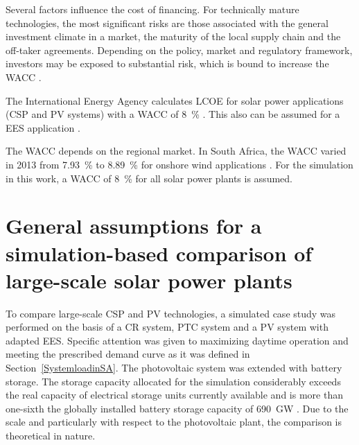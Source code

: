 Several factors influence the cost of financing. For technically mature technologies, the most significant risks are those associated with the general investment climate in a market, the maturity of the local supply chain and the off-taker agreements. Depending on the policy, market and regulatory framework, investors may be exposed to substantial risk, which is bound to increase the WACC \cite{IEA2014c}.


The International Energy Agency calculates LCOE for solar power applications (CSP and PV systems) with a WACC of \SI{8}{\percent} \cite{IEA2014c}. This also can be assumed for a EES application \cite{Zakeri2015}.


The WACC depends on the regional market. In South Africa, the WACC varied in 2013 from \SI{7.93}{\percent} to \SI{8.89}{\percent} for onshore wind applications \cite{IEA2015}. For the simulation in this work, a WACC of \SI{8}{\percent} for all solar power plants is assumed.

\section{General assumptions for a simulation-based comparison of large-scale solar power plants} \label{General assumptions}
To compare large-scale CSP and PV technologies, a simulated case study was performed on the basis of a CR system, PTC system and a PV system with adapted EES. Specific attention was given to maximizing daytime operation and meeting the prescribed demand curve as it was defined in Section~\ref{SystemloadinSA}. The photovoltaic system was extended with battery storage. The storage capacity allocated for the simulation considerably exceeds the real capacity of electrical storage units currently available and is more than one-sixth the globally installed battery storage capacity of \SI{690}{GW} \cite{IEA2015}. Due to the scale and particularly with respect to the photovoltaic plant, the comparison is theoretical in nature.

